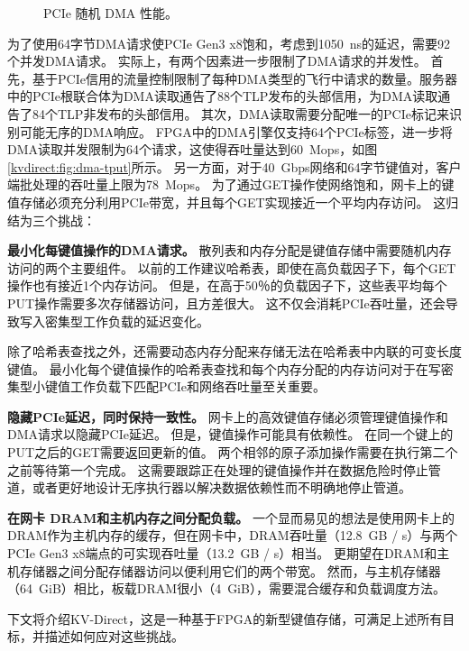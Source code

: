 \begin{figure}[t]
	\centering
	\caption{PCIe 随机 DMA 性能。}
	\label{kvdirect:fig:dma-perf}
\end{figure}

为了使用64字节DMA请求使PCIe Gen3 x8饱和，考虑到1050~ns的延迟，需要92个并发DMA请求。
实际上，有两个因素进一步限制了DMA请求的并发性。
首先，基于PCIe信用的流量控制限制了每种DMA类型的飞行中请求的数量。服务器中的PCIe根联合体为DMA读取通告了88个TLP发布的头部信用，为DMA读取通告了84个TLP非发布的头部信用。
其次，DMA读取需要分配唯一的PCIe标记来识别可能无序的DMA响应。
FPGA中的DMA引擎仅支持64个PCIe标签，进一步将DMA读取并发限制为64个请求，这使得吞吐量达到60~Mops，如图\ref {kvdirect:fig:dma-tput}所示。
另一方面，对于40~Gbps网络和64字节键值对，客户端批处理的吞吐量上限为78~Mops。
为了通过GET操作使网络饱和，网卡上的键值存储必须充分利用PCIe带宽，并且每个GET实现接近一个平均内存访问。
这归结为三个挑战：

\textbf {最小化每键值操作的DMA请求。}
散列表和内存分配是键值存储中需要随机内存访问的两个主要组件。
以前的工作建议哈希表\cite {dragojevic2014farm,breslow2016horton}，即使在高负载因子下，每个GET操作也有接近1个内存访问。
但是，在高于50％的负载因子下，这些表平均每个PUT操作需要多次存储器访问，且方差很大。
这不仅会消耗PCIe吞吐量，还会导致写入密集型工作负载的延迟变化。

除了哈希表查找之外，还需要动态内存分配来存储无法在哈希表中内联的可变长度键值。
最小化每个键值操作的哈希表查找和每个内存分配的内存访问对于在写密集型小键值工作负载下匹配PCIe和网络吞吐量至关重要。

\textbf {隐藏PCIe延迟，同时保持一致性。}
网卡上的高效键值存储必须管理键值操作和DMA请求以隐藏PCIe延迟。
但是，键值操作可能具有依赖性。
在同一个键上的PUT之后的GET需要返回更新的值。
两个相邻的原子添加操作需要在执行第二个之前等待第一个完成。
这需要跟踪正在处理的键值操作并在数据危险时停止管道，或者更好地设计无序执行器以解决数据依赖性而不明确地停止管道。


\textbf {在网卡 DRAM和主机内存之间分配负载。}
一个显而易见的想法是使用网卡上的DRAM作为主机内存的缓存，但在网卡中，DRAM吞吐量（12.8~GB / s）与两个PCIe Gen3 x8端点的可实现吞吐量（13.2~GB / s）相当。 
更期望在DRAM和主机存储器之间分配存储器访问以便利用它们的两个带宽。
然而，与主机存储器（64~GiB）相比，板载DRAM很小（4~GiB），需要混合缓存和负载调度方法。

下文将介绍KV-Direct，这是一种基于FPGA的新型键值存储，可满足上述所有目标，并描述如何应对这些挑战。
